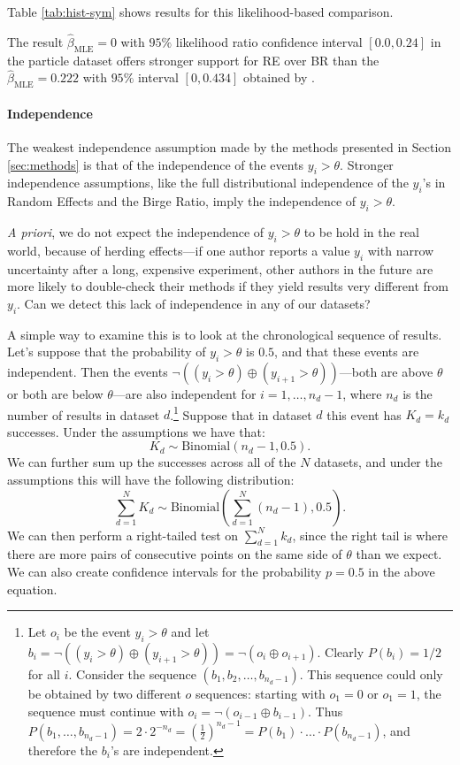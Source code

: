\documentclass[letterpaper,12pt]{article}
\begin{document}
Table \ref{tab:hist-sym} shows results for this likelihood-based comparison. %

The result $\hat\beta_{\mathrm{MLE}}=0$ with $95\%$ likelihood ratio confidence interval $[0.0,0.24]$ in the particle dataset offers stronger support for RE over BR than the $\hat\beta_{\mathrm{MLE}}=0.222$ with $95\%$ interval $[0,0.434]$ obtained by \citet[pg.~115]{baker2013meta}. %

\paragraph{Independence}

The weakest independence assumption made by the methods presented in Section \ref{sec:methods} is that of the independence of the events $y_i>\theta$. Stronger independence assumptions, like the full distributional independence of the $y_i$'s in Random Effects and the Birge Ratio, imply the independence of $y_i>\theta$.

\textit{A priori}, we do not expect the independence of $y_i>\theta$ to be hold in the real world, because of herding effects---if one author reports a value $y_i$ with narrow uncertainty after a long, expensive experiment, other authors in the future are more likely to double-check their methods if they yield results very different from $y_i$. Can we detect this lack of independence in any of our datasets?

A simple way to examine this is to look at the chronological sequence of results. Let's suppose that the probability of $y_i>\theta$ is $0.5$, and that these events are independent. Then the events $\neg((y_i>\theta)\oplus(y_{i+1}>\theta))$---both are above $\theta$ or both are below $\theta$---are also independent for $i=1,\ldots,n_d-1$, where $n_d$ is the number of results in dataset $d$.\footnote{Let $o_i$ be the event $y_i>\theta$ and let $b_i=\neg((y_i>\theta)\oplus(y_{i+1}>\theta))=\neg(o_i\oplus o_{i+1})$. Clearly $P(b_i)=1/2$ for all $i$. Consider the sequence $(b_1,b_2,\ldots,b_{n_d-1})$. This sequence could only be obtained by two different $o$ sequences: starting with $o_1=0$ or $o_1=1$, the sequence must continue with $o_i=\neg(o_{i-1}\oplus b_{i-1})$. Thus $P(b_1,\ldots,b_{n_d-1})=2\cdot 2^{-n_d}=(\frac{1}{2})^{n_d-1}=P(b_1)\cdot\ldots\cdot P(b_{n_d-1})$, and therefore the $b_i$'s are independent.} Suppose that in dataset $d$ this event has $K_d=k_d$ successes. Under the assumptions we have that:
\[K_d\sim\mathrm{Binomial}(n_d-1,0.5).\]
We can further sum up the successes across all of the $N$ datasets, and under the assumptions this will have the following distribution:
\[\sum_{d=1}^NK_d\sim \mathrm{Binomial}\left(\sum_{d=1}^N(n_d-1),0.5\right).\]
We can then perform a right-tailed test on $\sum_{d=1}^N k_d$, since the right tail is where there are more pairs of consecutive points on the same side of $\theta$ than we expect. We can also create confidence intervals for the probability $p=0.5$ in the above equation.
\end{document}
